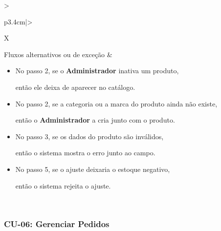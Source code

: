 \documentclass[12pt,a4paper]{article}
\begin{document}
{\begin{xltabular}{\textwidth}{>{\raggedright\arraybackslash}p{3.4cm}|>{\raggedright\arraybackslash}X}
Fluxos alternativos ou de exceção & \begin{itemize}[nosep,leftmargin=2.2em,labelwidth=2.2em,labelsep=0pt,align=left,itemsep=4pt,before=\vspace{-\baselineskip},after=\vspace{-0.4\baselineskip}]\item[\textbf{A1}] No passo 2, se o \textbf{Administrador} inativa um produto,\par então ele deixa de aparecer no catálogo. \item[\textbf{A2}] No passo 2, se a categoria ou a marca do produto ainda não existe,\par então o \textbf{Administrador} a cria junto com o produto. \item[\textbf{E1}] No passo 3, se os dados do produto são inválidos,\par então o sistema mostra o erro junto ao campo. \item[\textbf{E2}] No passo 5, se o ajuste deixaria o estoque negativo,\par então o sistema rejeita o ajuste.\end{itemize}\\ \bottomrule
\end{xltabular}}

\Needspace{320pt}
\subsubsection{CU-06: Gerenciar Pedidos}
\end{document}
